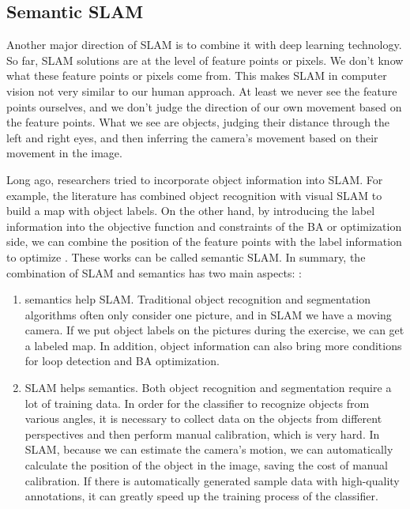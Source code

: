 \subsection{Semantic SLAM}
Another major direction of SLAM is to combine it with deep learning technology. So far, SLAM solutions are at the level of feature points or pixels. We don't know what these feature points or pixels come from. This makes SLAM in computer vision not very similar to our human approach. At least we never see the feature points ourselves, and we don't judge the direction of our own movement based on the feature points. What we see are objects, judging their distance through the left and right eyes, and then inferring the camera's movement based on their movement in the image.

Long ago, researchers tried to incorporate object information into SLAM. For example, the literature \cite{Nuechter2008, Civera2011, Koppula2011, Anand2012} has combined object recognition with visual SLAM to build a map with object labels. On the other hand, by introducing the label information into the objective function and constraints of the BA or optimization side, we can combine the position of the feature points with the label information to optimize \textsuperscript{\cite{Fioraio2013}}. These works can be called semantic SLAM. In summary, the combination of SLAM and semantics has two main aspects: \textsuperscript{\cite{Cadena2016}}:

\begin{enumerate}
\item semantics help SLAM. Traditional object recognition and segmentation algorithms often only consider one picture, and in SLAM we have a moving camera. If we put object labels on the pictures during the exercise, we can get a labeled map. In addition, object information can also bring more conditions for loop detection and BA optimization.
\item SLAM helps semantics. Both object recognition and segmentation require a lot of training data. In order for the classifier to recognize objects from various angles, it is necessary to collect data on the objects from different perspectives and then perform manual calibration, which is very hard. In SLAM, because we can estimate the camera's motion, we can automatically calculate the position of the object in the image, saving the cost of manual calibration. If there is automatically generated sample data with high-quality annotations, it can greatly speed up the training process of the classifier.
\end{enumerate}

